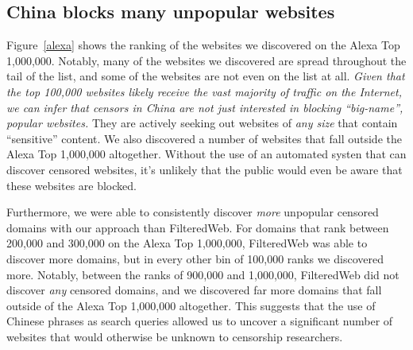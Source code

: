 \begin{table}[b]
  \begin{center}
  \end{center}
\caption{\label{breakdown} Total number of censored domains discovered.}
\end{table}

\subsection{China blocks many unpopular websites}
Figure~\ref{alexa} shows the ranking of the websites we discovered on
the Alexa Top 1,000,000. Notably, many of the websites we discovered
are spread throughout the tail of the list, and some of the websites
are not even on the list at all. \textit{Given that the top 100,000 websites
likely receive the vast majority of traffic on the Internet, we can
infer that censors in China are not just interested in blocking
``big-name'', popular websites.} They are actively seeking out websites
of \textit{any size} that contain ``sensitive'' content. We also
discovered a number of websites that fall outside the Alexa Top
1,000,000 altogether. Without the use of an automated systen that can
discover censored websites, it's unlikely that the public would even
be aware that these websites are blocked.

Furthermore, we were able to consistently discover \textit{more} unpopular
censored domains with our approach than FilteredWeb. For domains that
rank between 200,000 and 300,000 on the Alexa Top 1,000,000,
FilteredWeb was able to discover more domains, but in every other bin of
100,000 ranks we discovered more. Notably, between the ranks of 900,000
and 1,000,000, FilteredWeb did not discover \textit{any} censored domains, and
we discovered far more domains that fall outside of the Alexa Top
1,000,000 altogether. This suggests that the use of Chinese phrases
as search queries allowed us to uncover a significant number of
websites that would otherwise be unknown to censorship researchers.


